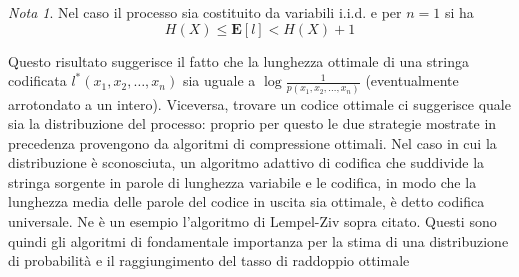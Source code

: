 \documentclass[a4paper,11pt]{book}
\theoremstyle{plain}
\theoremstyle{definition}
\theoremstyle{remark}
\newtheorem*{nota}{Nota}
\newcommand{\E}{\mathbf{E}}
\begin{document}
\begin{nota}
	Nel caso il processo sia costituito da variabili i.i.d. e per $n=1$ si ha
	\begin{equation*}
		H(X) \leq \E[l]< H(X)+1
	\end{equation*}
\end{nota}
Questo risultato suggerisce il fatto che la lunghezza ottimale di una stringa codificata $l^*(x_1,x_2,\ldots,x_n)$ sia uguale a $\log\frac{1}{p(x_1,x_2,\ldots,x_n)}$ (eventualmente arrotondato a un intero). Viceversa, trovare un codice ottimale ci suggerisce quale sia la distribuzione del processo: proprio per questo le due strategie mostrate in precedenza provengono da algoritmi di compressione ottimali.\newline
Nel caso in cui la distribuzione è sconosciuta, un algoritmo adattivo di codifica che suddivide la stringa sorgente in parole di lunghezza variabile e le codifica, in modo che la lunghezza media delle parole del codice in uscita sia ottimale, è detto codifica universale. Ne è un esempio l'algoritmo di Lempel-Ziv \cite{LZ78} sopra citato.\newline
Questi sono quindi gli algoritmi di fondamentale importanza per la stima di una distribuzione di probabilità e il raggiungimento del tasso di raddoppio ottimale
\end{document}
